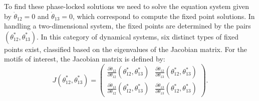 \documentclass[../main.tex]{subfiles}
\begin{document}
To find these phase-locked solutions we need to solve the equation system given by $\dot{\theta}_{12}=0$ and $\dot{\theta}_{13}=0$, which correspond to compute the fixed point solutions.
In handling a two-dimensional system, the fixed points are determined by the pairs$(\theta_{12}^{*},\theta_{13}^{*})$.
In this category of dynamical systems, six distinct types of fixed points exist, classified based on the eigenvalues of the Jacobian matrix.
For the motifs of interest, the Jacobian matrix is defined by:
\begin{equation}
    J(\theta_{12}^{*},\theta_{13}^{*}) = 
     \begin{pmatrix}
    \displaystyle\frac{\partial\dot{\theta}_{12}}{\partial\theta_{12}} (\theta_{12}^{*},\theta_{13}^{*}) & \displaystyle\frac{\partial\dot{\theta}_{12}}{\partial\theta_{13}}(\theta_{12}^{*},\theta_{13}^{*})\\ 
    \displaystyle\frac{\partial\dot{\theta}_{13}}{\partial\theta_{12}}(\theta_{12}^{*},\theta_{13}^{*}) & 
    \displaystyle\frac{\partial\dot{\theta}_{13}}{\partial\theta_{13}}(\theta_{12}^{*},\theta_{13}^{*})
    \end{pmatrix}.
    \label{eq:jacobian-matrix}
\end{equation}
\end{document}
